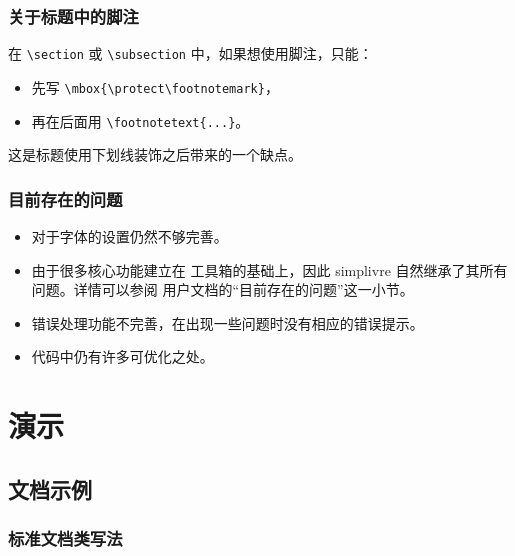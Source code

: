 \documentclass[puretext]{simplivre}
\providecommand{\simplivre}{\textsf{simplivre}}
\begin{document}
\section{关于标题中的脚注}
在 \lstinline|\section| 或 \lstinline|\subsection| 中，如果想使用脚注，只能：
\begin{itemize}
    \item 先写 \lstinline|\mbox{\protect\footnotemark}|，
    \item 再在后面用 \lstinline|\footnotetext{...}|。
\end{itemize}
这是标题使用下划线装饰之后带来的一个缺点。


\section{目前存在的问题}

\begin{itemize}[itemsep=.6em]
    \item 对于字体的设置仍然不够完善。
    \item 由于很多核心功能建立在 \ProjLib{} 工具箱的基础上，因此 \simplivre{} 自然继承了其所有问题。详情可以参阅 \ProjLib{} 用户文档的“目前存在的问题”这一小节。
    \item 错误处理功能不完善，在出现一些问题时没有相应的错误提示。
    \item 代码中仍有许多可优化之处。
\end{itemize}




\part{演示}

\chapter{文档示例}

\vspace*{-1.5\baselineskip}

\section{标准文档类写法}
\end{document}

